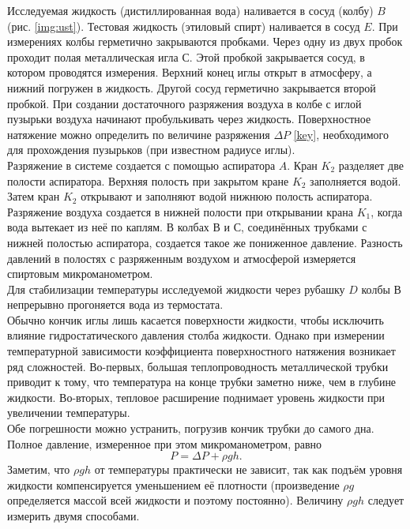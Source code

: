 \documentclass[a4paper, 12pt]{article}
\begin{document}
    \noindent Исследуемая жидкость (дистиллированная вода) наливается в сосуд (колбу) $ B $ (рис. \ref{img:ust}). Тестовая жидкость  (этиловый спирт) наливается  в сосуд $ E $.  При измерениях  колбы герметично закрываются  пробками. Через одну из двух пробок  проходит полая металлическая игла $ С $. Этой пробкой закрывается сосуд, в котором  проводятся измерения. Верхний конец иглы открыт в атмосферу, а нижний погружен в жидкость. Другой сосуд герметично закрывается второй пробкой. При создании достаточного  разряжения воздуха в колбе с иглой пузырьки воздуха начинают пробулькивать через жидкость. Поверхностное натяжение можно определить по величине разряжения $ \Delta P $ \eqref{key}, необходимого для прохождения пузырьков (при известном радиусе иглы). \\

    \noindent Разряжение в системе создается с помощью аспиратора $ A $. Кран $ K_2 $ разделяет две полости аспиратора. Верхняя полость при закрытом кране $ K_2 $ заполняется водой. Затем кран $ K_2 $ открывают и заполняют водой  нижнюю полость  аспиратора.  Разряжение воздуха создается в нижней полости  при открывании крана $ K_1 $, когда  вода вытекает из неё по каплям. В колбах $ В $ и $ С $, соединённых трубками с нижней полостью аспиратора, создается такое же пониженное давление. Разность давлений в полостях с разряженным воздухом и атмосферой измеряется спиртовым микроманометром.\\

    \noindent Для стабилизации температуры исследуемой жидкости через рубашку $ D $ колбы $ В $ непрерывно прогоняется вода из термостата.\\

    \noindent Обычно кончик иглы лишь касается поверхности жидкости, чтобы исключить влияние гидростатического давления столба жидкости. Однако при измерении температурной зависимости коэффициента поверхностного натяжения возникает ряд сложностей. Во-первых, большая теплопроводность металлической трубки приводит к тому, что температура на конце трубки заметно ниже, чем в глубине жидкости. Во-вторых, тепловое расширение поднимает уровень жидкости при увеличении температуры.\\

    \noindent Обе погрешности можно устранить, погрузив кончик трубки до самого дна. Полное давление, измеренное при этом микроманометром, равно \[ P = \Delta P + \rho g h.\] Заметим, что $ \rho gh $ от температуры практически не зависит, так как подъём уровня жидкости компенсируется уменьшением её плотности (произведение $ \rho g $ определяется массой всей жидкости и поэтому постоянно). Величину  $ \rho g h $ следует измерить двумя способами.\\
\end{document}
